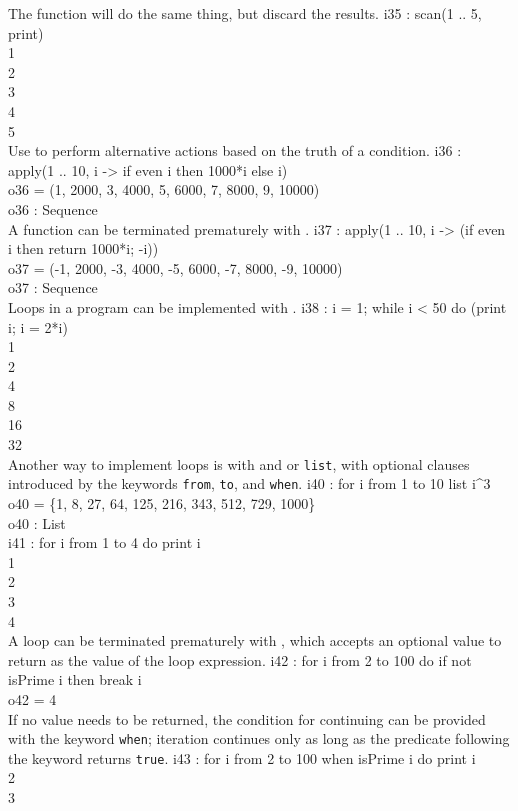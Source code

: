 \endOutput
The function  will do the same thing, but discard the results.
\beginOutput
i35 : scan(1 .. 5, print)\\
1\\
2\\
3\\
4\\
5\\
\endOutput
Use  to perform alternative actions
based on the truth of a condition.
\beginOutput
i36 : apply(1 .. 10, i -> if even i then 1000*i else i)\\
\emptyLine
o36 = (1, 2000, 3, 4000, 5, 6000, 7, 8000, 9, 10000)\\
\emptyLine
o36 : Sequence\\
\endOutput
A function can be terminated prematurely with .
\beginOutput
i37 : apply(1 .. 10, i -> (if even i then return 1000*i; -i))\\
\emptyLine
o37 = (-1, 2000, -3, 4000, -5, 6000, -7, 8000, -9, 10000)\\
\emptyLine
o37 : Sequence\\
\endOutput
Loops in a program can be implemented with .
\beginOutput
i38 : i = 1; while i < 50 do (print i; i = 2*i)\\
1\\
2\\
4\\
8\\
16\\
32\\
\endOutput
Another way to implement loops is with  and
 or {\tt list}, with optional
clauses introduced by the keywords {\tt from}, {\tt to}, and {\tt when}.
\beginOutput
i40 : for i from 1 to 10 list i^3\\
\emptyLine
o40 = \{1, 8, 27, 64, 125, 216, 343, 512, 729, 1000\}\\
\emptyLine
o40 : List\\
\endOutput
\beginOutput
i41 : for i from 1 to 4 do print i\\
1\\
2\\
3\\
4\\
\endOutput
A loop can be terminated prematurely with , which accepts an
optional value to return as the value of the loop expression.
\beginOutput
i42 : for i from 2 to 100 do if not isPrime i then break i\\
\emptyLine
o42 = 4\\
\endOutput
If no value needs to be returned, the condition for continuing can be
provided with the keyword {\tt when}; iteration continues only as long as the
predicate following the keyword returns {\tt true}.
\beginOutput
i43 : for i from 2 to 100 when isPrime i do print i\\
2\\
3\\
\endOutput


